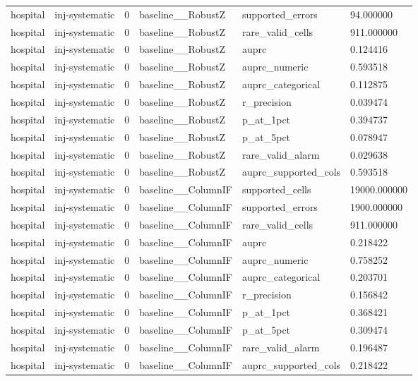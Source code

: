 \begin{tabular}{llllll}
hospital & inj-systematic & 0 & baseline\_\_RobustZ & supported\_errors & 94.000000 \\
hospital & inj-systematic & 0 & baseline\_\_RobustZ & rare\_valid\_cells & 911.000000 \\
hospital & inj-systematic & 0 & baseline\_\_RobustZ & auprc & 0.124416 \\
hospital & inj-systematic & 0 & baseline\_\_RobustZ & auprc\_numeric & 0.593518 \\
hospital & inj-systematic & 0 & baseline\_\_RobustZ & auprc\_categorical & 0.112875 \\
hospital & inj-systematic & 0 & baseline\_\_RobustZ & r\_precision & 0.039474 \\
hospital & inj-systematic & 0 & baseline\_\_RobustZ & p\_at\_1pct & 0.394737 \\
hospital & inj-systematic & 0 & baseline\_\_RobustZ & p\_at\_5pct & 0.078947 \\
hospital & inj-systematic & 0 & baseline\_\_RobustZ & rare\_valid\_alarm & 0.029638 \\
hospital & inj-systematic & 0 & baseline\_\_RobustZ & auprc\_supported\_cols & 0.593518 \\
hospital & inj-systematic & 0 & baseline\_\_ColumnIF & supported\_cells & 19000.000000 \\
hospital & inj-systematic & 0 & baseline\_\_ColumnIF & supported\_errors & 1900.000000 \\
hospital & inj-systematic & 0 & baseline\_\_ColumnIF & rare\_valid\_cells & 911.000000 \\
hospital & inj-systematic & 0 & baseline\_\_ColumnIF & auprc & 0.218422 \\
hospital & inj-systematic & 0 & baseline\_\_ColumnIF & auprc\_numeric & 0.758252 \\
hospital & inj-systematic & 0 & baseline\_\_ColumnIF & auprc\_categorical & 0.203701 \\
hospital & inj-systematic & 0 & baseline\_\_ColumnIF & r\_precision & 0.156842 \\
hospital & inj-systematic & 0 & baseline\_\_ColumnIF & p\_at\_1pct & 0.368421 \\
hospital & inj-systematic & 0 & baseline\_\_ColumnIF & p\_at\_5pct & 0.309474 \\
hospital & inj-systematic & 0 & baseline\_\_ColumnIF & rare\_valid\_alarm & 0.196487 \\
hospital & inj-systematic & 0 & baseline\_\_ColumnIF & auprc\_supported\_cols & 0.218422 \\

\end{tabular}
